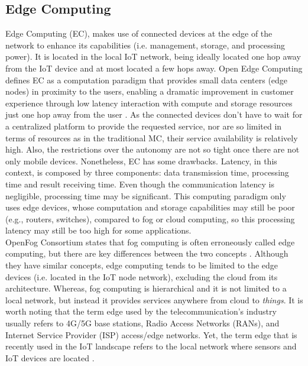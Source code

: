 \subsection{Edge Computing}
Edge Computing (EC), makes use of connected devices at the edge of the network to enhance its capabilities (i.e. management, storage, and processing power). It is located in the local IoT network, being ideally located one hop away from the IoT device and at most located a few hops away. Open Edge Computing defines EC as a computation paradigm that provides small data centers (edge nodes) in proximity to the users, enabling a dramatic improvement in customer experience through low latency interaction with compute and storage resources just one hop away from the user \cite{OpenEdge73:online}. As the connected devices don't have to wait for a centralized platform to provide the requested service, nor are so limited in terms of resources as in the traditional MC, their service availability is relatively high. Also, the restrictions over the autonomy are not so tight once there are not only mobile devices. Nonetheless, EC has some drawbacks. Latency, in this context, is composed by three components: data transmission time, processing time and result receiving time. Even though the communication latency is negligible, processing time may be significant. This computing paradigm only uses edge devices, whose computation and storage capabilities may still be poor (e.g., routers, switches), compared to fog or cloud computing, so this processing latency may still be too high for some applications.\\
\noindent\tab OpenFog Consortium states that fog computing is often erroneously called edge computing, but there are key differences between the two concepts \cite{openfog2017openfog}. Although they have similar concepts, edge computing tends to be limited to the edge devices (i.e. located in the IoT node network), excluding the cloud from its architecture. Whereas, fog computing is hierarchical and it is not limited to a local network, but instead it provides services anywhere from cloud to \textit{things}. It is worth noting that the term edge used by the telecommunication's industry usually refers to 4G/5G base stations, Radio Access Networks (RANs), and Internet Service Provider (ISP) access/edge networks. Yet, the term edge that is recently used in the IoT landscape refers to the local network where sensors and IoT devices are located \cite{yousefpour2018all}.

